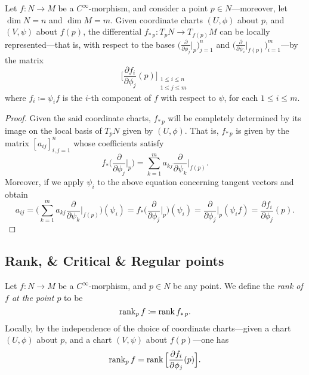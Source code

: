 \begin{proposition}
\label{prop:local-expression-differential}
Let \(f: N \to M\) be a \(C^{\infty}\)-morphism, and consider a point
\(p \in N\)---moreover, let \(\dim N = n\) and \(\dim M = m\). Given coordinate
charts \((U, \phi)\) about \(p\), and \((V, \psi)\) about \(f(p)\), the
differential \(f_{*\, p}: T_p N \to T_{f(p)} M\) can be locally
represented---that is, with respect to the bases
\(\big(\frac{\partial}{\partial \phi_j}\big|_p\big)_{j=1}^n\) and
\(\big(\frac{\partial}{\partial \psi_i}\big|_{f(p)}\big)_{i=1}^m\)---by the
matrix
\[
\Big[
\frac{\partial f_i}{\partial \phi_j}(p)
\Big]_{\substack{1 \leq i \leq n \\ 1 \leq j \leq m}}
\]
where \(f_i \coloneq \psi_i f\) is the \(i\)-th component of \(f\) with respect
to \(\psi\), for each \(1 \leq i \leq m\).
\end{proposition}

\begin{proof}
Given the said coordinate charts, \(f_{*\, p}\) will be completely determined
by its image on the local basis of \(T_p N\) given by \((U, \phi)\). That is,
\(f_{*\, p}\) is given by the matrix \([a_{i j}]_{i, j=1}^n\) whose coefficients
satisfy
\[
f_{*} \Big( \frac{\partial}{\partial \phi_j}\Big|_p \Big)
= \sum_{k=1}^m a_{k j} \frac{\partial}{\partial \psi_k}\Big|_{f(p)}.
\]
Moreover, if we apply \(\psi_i\) to the above equation concerning tangent
vectors and obtain
\[
a_{ij} = \Big(
\sum_{k=1}^m a_{k j} \frac{\partial}{\partial \psi_k}\Big|_{f(p)}
\Big)(\psi_i)
= f_{*}\Big( \frac{\partial}{\partial \phi_j}\Big|_p \Big)(\psi_i)
= \frac{\partial}{\partial \phi_j}\Big|_p (\psi_i f)
= \frac{\partial f_i}{\partial \phi_j}(p).
\]
\end{proof}

\subsection{Rank, \& Critical \& Regular points}

\begin{definition}
\label{def:rank-smooth-map}
Let \(f: N \to M\) be a \(C^{\infty}\)-morphism, and \(p \in N\) be any
point. We define the \emph{rank of \(f\) at the point \(p\)} to be
\[
\operatorname{rank}_p f \coloneq \operatorname{rank} f_{*\, p}.
\]
Locally, by the independence of the choice of coordinate charts---given a chart
\((U, \phi)\) about \(p\), and a chart \((V, \psi)\) about \(f(p)\)---one has
\[
\operatorname{rank}_p f = \operatorname{rank} \Big[ \frac{\partial f_i}{\partial \phi_j}(p) \Big].
\]
\end{definition}

